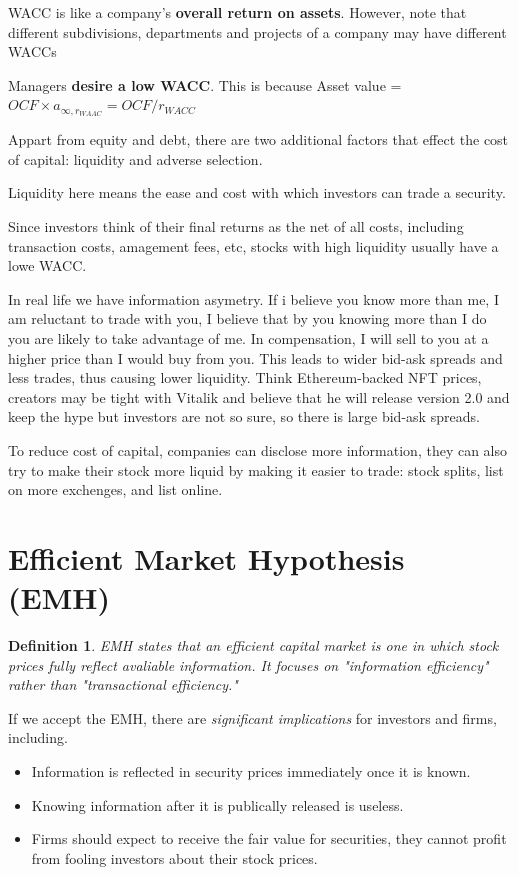 \documentclass{article}
\newtheorem{definition}{Definition}
\begin{document}
WACC is like a company's \textbf{overall return on assets}. However, note that different subdivisions, departments and projects of a company may have different WACCs

Managers \textbf{desire a low WACC}. This is because Asset value = $OCF \times a_{\infty, r_{WAAC}} = OCF/ r_{WACC}$

Appart from equity and debt, there are two additional factors that effect the cost of capital: liquidity and adverse selection. 

Liquidity here means the ease and cost with which investors can trade a security. 

Since investors think of their final returns as the net of all costs, including transaction costs, amagement fees, etc, stocks with high liquidity usually have a lowe WACC.

In real life we have information asymetry. If i believe you know more than me, I am reluctant to trade with you, I believe that by you knowing more than I do you are likely to take advantage of me. In compensation, I will sell to you at a higher price than I would buy from you. This leads to wider bid-ask spreads and less trades, thus causing lower liquidity. Think Ethereum-backed NFT prices, creators may be tight with Vitalik and believe that he will release version 2.0 and keep the hype but investors are not so sure, so there is large bid-ask spreads. 

To reduce cost of capital, companies can disclose more information, they can also try to make their stock more liquid by making it easier to trade: stock splits, list on more exchenges, and list online. 

\section{Efficient Market Hypothesis (EMH)}
\begin{definition}
EMH states that an efficient capital market is one in which stock prices fully reflect avaliable information. It focuses on "information efficiency" rather than "transactional efficiency."
\end{definition}

If we accept the EMH, there are \textit{significant implications} for investors and firms, including. 
\begin{itemize}
\item Information is reflected in security prices immediately once it is known. 
\item Knowing information after it is publically released is useless. 
\item Firms should expect to receive the fair value for securities, they cannot profit from fooling investors about their stock prices.
\end{itemize}
\end{document}
